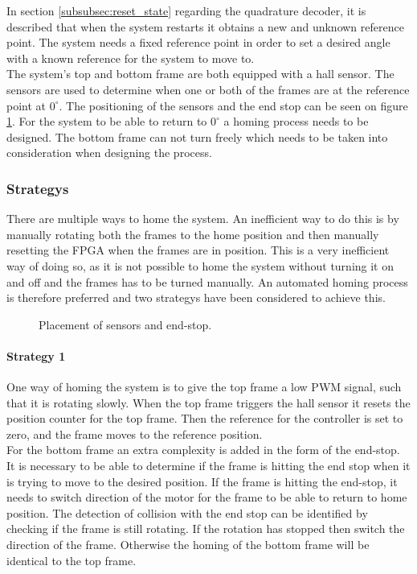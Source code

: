 \documentclass[../../../main]{subfiles}
\begin{document}
In section \ref{subsubsec:reset_state} regarding the quadrature decoder, it is described that when the system restarts it obtains a new and unknown reference point.
The system needs a fixed reference point in order to set a desired angle with a known reference for the system to move to. \\
The system's top and bottom frame are both equipped with a hall sensor.
The sensors are used to determine when one or both of the frames are at the reference point at $0^\circ$. The positioning of the sensors and the end stop can be seen on figure \ref{fig:homing_system}.
For the system to be able to return to $0^\circ$ a homing process needs to be designed.
The bottom frame can not turn freely which needs to be taken into consideration when designing the process.
\subsubsection{Strategys}
There are multiple ways to home the system. An inefficient way to do this is by manually rotating both the frames to the home position and then manually resetting the FPGA when the frames are in position.
This is a very inefficient way of doing so, as it is not possible to home the system without turning it on and off and the frames has to be turned manually.
An automated homing process is therefore preferred and two strategys have been considered to achieve this.

\begin{figure}[H]
  \centering
  \def\svgwidth{\textwidth}
  
  \caption{Placement of sensors and end-stop.}
  \label{fig:homing_system}
\end{figure}
\paragraph{Strategy 1}%
\label{par:method_1}
One way of homing the system is to give the top frame a low PWM signal, such that it is rotating slowly.
When the top frame triggers the hall sensor it resets the position counter for the top frame.
Then the reference for the controller is set to zero, and the frame moves to the reference position.
\\
For the bottom frame an extra complexity is added in the form of the end-stop. It is necessary to be able to determine if the frame is hitting the end stop when it is trying to move to the desired position.
If the frame is hitting the end-stop, it needs to switch direction of the motor for the frame to be able to return to home position.
The detection of collision with the end stop can be identified by checking if the frame is still rotating. If the rotation has stopped then switch the direction of the frame.
Otherwise the homing of the bottom frame will be identical to the top frame.
\end{document}
